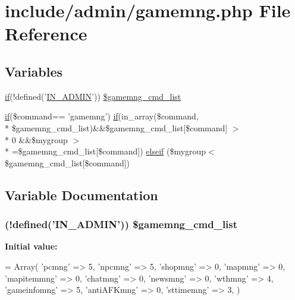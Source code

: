 \hypertarget{gamemng_8php}{\section{include/admin/gamemng.php File Reference}
\label{gamemng_8php}
}
\subsection*{Variables}
\begin{DoxyCompactItemize}
\item 
\hyperlink{login__old_8php_a4ac1118c2e44c513a674bc1793ba6c90}{if}(!defined('\hyperlink{admin_8php_ad49472b0cdee543164375bf133a537f1}{I\+N\+\_\+\+A\+D\+M\+I\+N}')) \hyperlink{gamemng_8php_a80f4a0db58cc0aadf937c404b58663f0}{\$gamemng\+\_\+cmd\+\_\+list}
\item 
\hyperlink{login__old_8php_a4ac1118c2e44c513a674bc1793ba6c90}{if}(\$command== 'gamemng') \hyperlink{login__old_8php_a4ac1118c2e44c513a674bc1793ba6c90}{if}(in\+\_\+array(\$command, \\*
\$gamemng\+\_\+cmd\+\_\+list)\&\&\$gamemng\+\_\+cmd\+\_\+list\mbox{[}\$command\mbox{]} $>$\\*
 0 \&\&\$mygroup $>$\\*
=\$gamemng\+\_\+cmd\+\_\+list\mbox{[}\$command\mbox{]}) \hyperlink{gamemng_8php_ab99a9358802fac6b0d0baa309cf1b001}{elseif} (\$mygroup$<$ \$gamemng\+\_\+cmd\+\_\+list\mbox{[}\$command\mbox{]})
\end{DoxyCompactItemize}


\subsection{Variable Documentation}
\hypertarget{gamemng_8php_a80f4a0db58cc0aadf937c404b58663f0}{
\subsubsection[{\$gamemng\+\_\+cmd\+\_\+list}]{ (!defined('{\bf I\+N\+\_\+\+A\+D\+M\+I\+N}')) \$gamemng\+\_\+cmd\+\_\+list}}\label{gamemng_8php_a80f4a0db58cc0aadf937c404b58663f0}
{\bfseries Initial value\+:}
\begin{DoxyCode}
= Array(
    \textcolor{stringliteral}{'pcmng'} => 5,
    \textcolor{stringliteral}{'npcmng'} => 5,
    \textcolor{stringliteral}{'shopmng'} => 0,
    \textcolor{stringliteral}{'mapmng'} => 0,
    \textcolor{stringliteral}{'mapitemmng'} => 0,
    \textcolor{stringliteral}{'chatmng'} => 0,
    \textcolor{stringliteral}{'newsmng'} => 0,
    \textcolor{stringliteral}{'wthmng'} => 4,
    \textcolor{stringliteral}{'gameinfomng'} => 5,
    \textcolor{stringliteral}{'antiAFKmng'} => 0,
    \textcolor{stringliteral}{'sttimemng'} => 3,
)
\end{DoxyCode}


